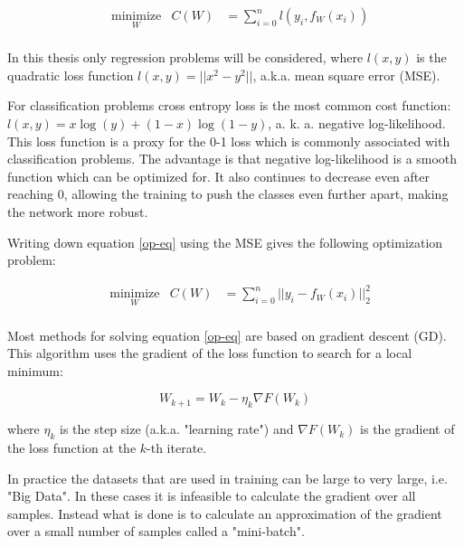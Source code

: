 \begin{equation}
\begin{aligned}
& \underset{W}{\text{minimize}}
& C(W) &= \sum\limits_{i=0}^{n}l(y_i,f_W(x_i)) \\
\end{aligned}
\label{op-eq}
\end{equation}

In this thesis only regression problems will be considered, where $l(x,y)$ is the quadratic loss function $l(x,y) = ||x^2-y^2||$, a.k.a. mean square error (MSE). 

For classification problems cross entropy loss is the most common cost function: $l(x,y) = x\log(y)+(1-x)\log(1-y)$, a. k. a. negative log-likelihood. This loss function is a proxy for the 0-1 loss which is commonly associated with classification problems. The advantage is that negative log-likelihood is a smooth function which can be optimized for. It also continues to decrease even after reaching 0, allowing the training to push the classes even further apart, making the network more robust.

Writing down equation \ref{op-eq} using the MSE gives the following optimization problem:

\begin{equation}
\begin{aligned}
& \underset{W}{\text{minimize}}
& C(W) &= \sum\limits_{i=0}^{n}||y_i - f_W(x_i)||^2_2 \\
\end{aligned}
\label{op2-eq}
\end{equation}

Most methods for solving equation \ref{op-eq} are based on gradient descent (GD). This algorithm uses the gradient of the loss function to search for a local minimum:

\begin{equation}
W_{k+1} = W_{k} - \eta_k\nabla F(W_k)
\label{gd-eq}
\end{equation}

where $\eta_k$ is the step size (a.k.a. "learning rate") and $\nabla F(W_k)$ is the gradient of the loss function at the $k$-th iterate.

In practice the datasets that are used in training can be large to very large, i.e. "Big Data". In these cases it is infeasible to calculate the gradient over all samples. Instead what is done is to calculate an approximation of the gradient over a small number of samples called a "mini-batch".

